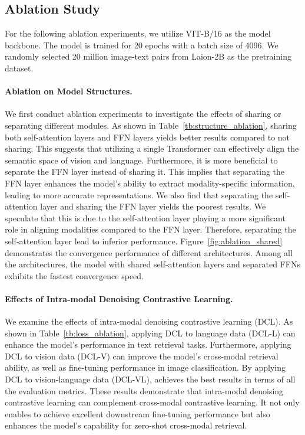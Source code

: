 \subsection{Ablation Study}
\label{sec:ablation}


For the following ablation experiments, we utilize VIT-B/16 as the model backbone. The model is trained for 20 epochs with a batch size of 4096. We randomly selected 20 million image-text pairs from Laion-2B as the pretraining dataset.

\paragraph{Ablation on Model Structures.}
We first conduct ablation experiments to investigate the effects of sharing or separating different modules.
As shown in Table~\ref{tb:structure_ablation}, sharing both self-attention layers and FFN layers yields better results compared to not sharing. This suggests that utilizing a single Transformer can effectively align the semantic space of vision and language.
Furthermore, it is more beneficial to separate the FFN layer instead of sharing it. This implies that separating the FFN layer enhances the model's ability to extract modality-specific information, leading to more accurate representations.
We also find that separating the self-attention layer and sharing the FFN layer yields the poorest results. We speculate that this is due to the self-attention layer playing a more significant role in aligning modalities compared to the FFN layer. Therefore, separating the self-attention layer lead to inferior performance.
Figure~\ref{fig:ablation_shared} demonstrates the convergence performance of different architectures. 
Among all the architectures, the model with shared self-attention layers and separated FFNs exhibits the fastest convergence speed.

\paragraph{Effects of Intra-modal Denoising Contrastive Learning.}
We examine the effects of intra-modal denoising contrastive learning (DCL).
As shown in Table~\ref{tb:loss_ablation}, applying DCL to language data (DCL-L) can enhance the model's performance in text retrieval tasks.
Furthermore, applying DCL to vision data (DCL-V) can improve the model's cross-modal retrieval ability, as well as fine-tuning performance in image classification. 
By applying DCL to vision-language data (DCL-VL), \onepeace achieves the best results in terms of all the evaluation metrics. 
These results demonstrate that intra-modal denoising contrastive learning can complement cross-modal contrastive learning.
It not only enables \onepeace to achieve excellent downstream fine-tuning performance but also enhances the model's capability for zero-shot cross-modal retrieval.

